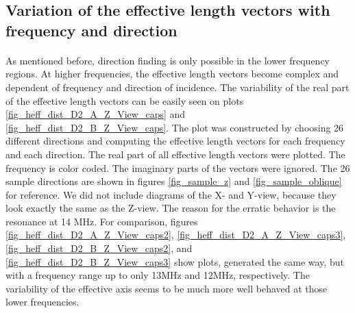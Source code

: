 \documentclass[a4paper,10pt]{thesis}
\begin{document}
\subsection{Variation of the effective length vectors with frequency and direction}

\paragraph*{}
As mentioned before, direction finding is only possible in the lower frequency regions. At higher frequencies, the effective length vectors become complex and dependent of frequency and direction of incidence. The variability of the real part of the effective length vectors can be easily seen on plots \ref{fig_heff_dist_D2_A_Z_View_caps} and \ref{fig_heff_dist_D2_B_Z_View_caps}. The plot was constructed by choosing 26 different directions and computing the effective length vectors for each frequency and each direction. The real part of all effective length vectors were plotted. The frequency is color coded. The imaginary parts of the vectors were ignored. The 26 sample directions are shown in figures \ref{fig_sample_z} and \ref{fig_sample_oblique} for reference. We did not include diagrams of the X- and Y-view, because they look exactly the same as the Z-view. The reason for the erratic behavior is the resonance at 14 MHz. For comparison, figures \ref{fig_heff_dist_D2_A_Z_View_caps2}, \ref{fig_heff_dist_D2_A_Z_View_caps3}, \ref{fig_heff_dist_D2_B_Z_View_caps2}, and \ref{fig_heff_dist_D2_B_Z_View_caps3} show plots, generated the same way, but with a frequency range up to only 13MHz and 12MHz, respectively. The variability of the effective axis seems to be much more well behaved at those lower frequencies.\\
\\
\end{document}
